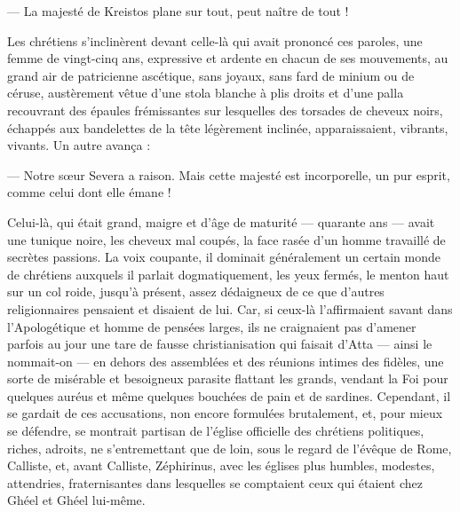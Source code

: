 \documentclass[a4paper, 11pt, oneside, polutonikogreek, french]{article}
\begin{document}
--- La majesté de Kreistos plane sur tout, peut naître de tout !

Les chrétiens s'inclinèrent devant celle-là qui avait prononcé ces paroles, une femme de vingt-cinq ans, expressive et ardente en chacun de ses mouvements, au grand air de patricienne ascétique, sans joyaux, sans fard de minium ou de céruse, austèrement vêtue d'une stola blanche à plis droits et d'une palla recouvrant des épaules frémissantes sur lesquelles des torsades de cheveux noirs, échappés aux bandelettes de la tête légèrement inclinée, apparaissaient, vibrants, vivants. Un autre avança :

--- Notre sœur Severa a raison. Mais cette majesté est incorporelle, un pur esprit, comme celui dont elle émane !

Celui-là, qui était grand, maigre et d'âge de maturité --- quarante ans --- avait une tunique noire, les cheveux mal coupés, la face rasée d'un homme travaillé de secrètes passions. La voix coupante, il dominait généralement un certain monde de chrétiens auxquels il parlait dogmatiquement, les yeux fermés, le menton haut sur un col roide, jusqu'à présent, assez dédaigneux de ce que d'autres religionnaires pensaient et disaient de lui. Car, si ceux-là l'affirmaient savant dans l'Apologétique et homme de pensées larges, ils ne craignaient pas d'amener parfois au jour une tare de fausse christianisation qui faisait d'Atta --- ainsi le nommait-on --- en dehors des assemblées et des réunions intimes des fidèles, une sorte de misérable et besoigneux parasite flattant les grands, vendant la Foi pour quelques auréus et même quelques bouchées de pain et de sardines. Cependant, il se gardait de ces accusations, non encore formulées brutalement, et, pour mieux se défendre, se montrait partisan de l'église officielle des chrétiens politiques, riches, adroits, ne s'entremettant que de loin, sous le regard de l'évêque de Rome, Calliste, et, avant Calliste, Zéphirinus, avec les églises plus humbles, modestes, attendries, fraternisantes dans lesquelles se comptaient ceux qui étaient chez Ghéel et Ghéel lui-même.
\end{document}
